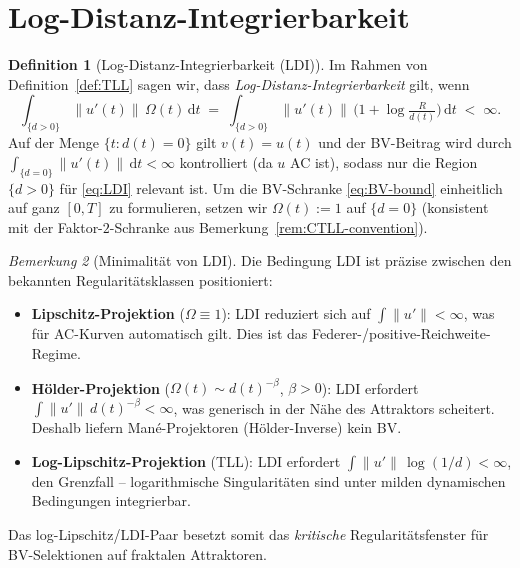\documentclass[12pt,a4paper]{article}
\theoremstyle{definition}
\newtheorem{definition}{Definition}[section]
\theoremstyle{plain}
\theoremstyle{remark}
\newtheorem{remark}[definition]{Bemerkung}
\begin{document}
\section{Log-Distanz-Integrierbarkeit}
\label{sec:LDI}

\begin{definition}[Log-Distanz-Integrierbarkeit (LDI)]
\label{def:LDI}
Im Rahmen von Definition~\ref{def:TLL} sagen wir, dass
\emph{Log-Distanz-Integrierbarkeit} gilt, wenn
\begin{equation}\label{eq:LDI}
  \int_{\{d>0\}} \|u'(t)\|\,\Omega(t)\,\mathrm{d}t
  \;=\;
  \int_{\{d>0\}} \|u'(t)\|\,
  \bigl(1 + \log\tfrac{R}{d(t)}\bigr)\,\mathrm{d}t
  \;<\; \infty.
\end{equation}
Auf der Menge $\{t : d(t) = 0\}$ gilt $v(t) = u(t)$ und der
BV-Beitrag wird durch $\int_{\{d=0\}} \|u'(t)\|\,\mathrm{d}t
< \infty$ kontrolliert (da $u$ AC ist), sodass nur die Region
$\{d > 0\}$ für \eqref{eq:LDI} relevant ist.  Um die
BV-Schranke \eqref{eq:BV-bound} einheitlich auf ganz $[0,T]$
zu formulieren, setzen wir $\Omega(t) := 1$ auf $\{d=0\}$
(konsistent mit der Faktor-$2$-Schranke aus
Bemerkung~\ref{rem:CTLL-convention}).
\end{definition}

\begin{remark}[Minimalität von LDI]
\label{rem:LDI-minimal}
Die Bedingung LDI ist präzise zwischen den bekannten
Regularitätsklassen positioniert:
\begin{itemize}
  \item \textbf{Lipschitz-Projektion} ($\Omega \equiv 1$):
    LDI reduziert sich auf $\int \|u'\| < \infty$, was für
    AC-Kurven automatisch gilt.  Dies ist das Federer-/positive-Reichweite-Regime.
  \item \textbf{Hölder-Projektion} ($\Omega(t) \sim d(t)^{-\beta}$,
    $\beta > 0$): LDI erfordert $\int \|u'\|\,d(t)^{-\beta} < \infty$,
    was generisch in der Nähe des Attraktors scheitert.  Deshalb
    liefern Mané-Projektoren (Hölder-Inverse) kein BV.
  \item \textbf{Log-Lipschitz-Projektion} (TLL):
    LDI erfordert $\int \|u'\|\,\log(1/d) < \infty$, den
    Grenzfall -- logarithmische Singularitäten sind unter milden
    dynamischen Bedingungen integrierbar.
\end{itemize}
Das log-Lipschitz/LDI-Paar besetzt somit das \emph{kritische}
Regularitätsfenster für BV-Selektionen auf fraktalen Attraktoren.
\end{remark}
\end{document}
